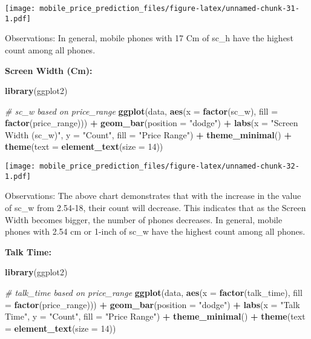 \documentclass[
]{article}
\newenvironment{Shaded}{\begin{snugshade}}{\end{snugshade}}
\newcommand{\AttributeTok}[1]{\textcolor[rgb]{0.13,0.29,0.53}{#1}}
\newcommand{\CommentTok}[1]{\textcolor[rgb]{0.56,0.35,0.01}{\textit{#1}}}
\newcommand{\DecValTok}[1]{\textcolor[rgb]{0.00,0.00,0.81}{#1}}
\newcommand{\FunctionTok}[1]{\textcolor[rgb]{0.13,0.29,0.53}{\textbf{#1}}}
\newcommand{\NormalTok}[1]{#1}
\newcommand{\SpecialCharTok}[1]{\textcolor[rgb]{0.81,0.36,0.00}{\textbf{#1}}}
\newcommand{\StringTok}[1]{\textcolor[rgb]{0.31,0.60,0.02}{#1}}
\begin{document}
\texttt{[image: mobile\_price\_prediction\_files/figure-latex/unnamed-chunk-31-1.pdf]}

Observations: In general, mobile phones with 17 Cm of sc\_h have the
highest count among all phones.

\textbf{Screen Width (Cm):}

\begin{Shaded}
\begin{Highlighting}[]
\FunctionTok{library}\NormalTok{(ggplot2)}

\CommentTok{\# sc\_w based on price\_range}
\FunctionTok{ggplot}\NormalTok{(data, }\FunctionTok{aes}\NormalTok{(}\AttributeTok{x =} \FunctionTok{factor}\NormalTok{(sc\_w), }\AttributeTok{fill =} \FunctionTok{factor}\NormalTok{(price\_range))) }\SpecialCharTok{+}
  \FunctionTok{geom\_bar}\NormalTok{(}\AttributeTok{position =} \StringTok{"dodge"}\NormalTok{) }\SpecialCharTok{+}
  \FunctionTok{labs}\NormalTok{(}\AttributeTok{x =} \StringTok{"Screen Width (sc\_w)"}\NormalTok{, }\AttributeTok{y =} \StringTok{"Count"}\NormalTok{, }\AttributeTok{fill =} \StringTok{"Price Range"}\NormalTok{) }\SpecialCharTok{+}
  \FunctionTok{theme\_minimal}\NormalTok{() }\SpecialCharTok{+}
  \FunctionTok{theme}\NormalTok{(}\AttributeTok{text =} \FunctionTok{element\_text}\NormalTok{(}\AttributeTok{size =} \DecValTok{14}\NormalTok{))}
\end{Highlighting}
\end{Shaded}

\texttt{[image: mobile\_price\_prediction\_files/figure-latex/unnamed-chunk-32-1.pdf]}

Observations: The above chart demonstrates that with the increase in the
value of sc\_w from 2.54-18, their count will decrease. This indicates
that as the Screen Width becomes bigger, the number of phones decreases.
In general, mobile phones with 2.54 cm or 1-inch of sc\_w have the
highest count among all phones.

\textbf{Talk Time:}

\begin{Shaded}
\begin{Highlighting}[]
\FunctionTok{library}\NormalTok{(ggplot2)}

\CommentTok{\# talk\_time based on price\_range}
\FunctionTok{ggplot}\NormalTok{(data, }\FunctionTok{aes}\NormalTok{(}\AttributeTok{x =} \FunctionTok{factor}\NormalTok{(talk\_time), }\AttributeTok{fill =} \FunctionTok{factor}\NormalTok{(price\_range))) }\SpecialCharTok{+}
  \FunctionTok{geom\_bar}\NormalTok{(}\AttributeTok{position =} \StringTok{"dodge"}\NormalTok{) }\SpecialCharTok{+}
  \FunctionTok{labs}\NormalTok{(}\AttributeTok{x =} \StringTok{"Talk Time"}\NormalTok{, }\AttributeTok{y =} \StringTok{"Count"}\NormalTok{, }\AttributeTok{fill =} \StringTok{"Price Range"}\NormalTok{) }\SpecialCharTok{+}
  \FunctionTok{theme\_minimal}\NormalTok{() }\SpecialCharTok{+}
  \FunctionTok{theme}\NormalTok{(}\AttributeTok{text =} \FunctionTok{element\_text}\NormalTok{(}\AttributeTok{size =} \DecValTok{14}\NormalTok{))}
\end{Highlighting}
\end{Shaded}
\end{document}
